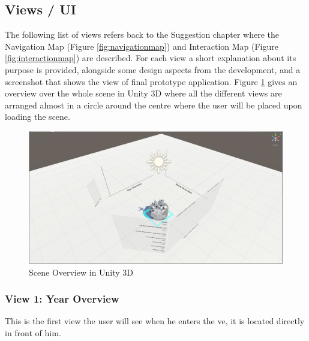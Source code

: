 \subsection{Views / UI}

The following list of views refers back to the Suggestion chapter where the Navigation Map (Figure \ref{fig:navigationmap}) and Interaction Map (Figure \ref{fig:interactionmap}) are described. For each view a short explanation about its purpose is provided, alongside some design aspects from the development, and a screenshot that shows the view of final prototype application. Figure \ref{fig:unityoverview} gives an overview over the whole scene in Unity 3D where all the different views are arranged almost in a circle around the centre where the user will be placed upon loading the scene.

\begin{figure}[h]
	\begin{center}
		\includegraphics[width=12cm]{03_Figures/08_Development/Unity_Overview.png}
		\caption{Scene Overview in Unity 3D}
		\label{fig:unityoverview}
	\end{center}
\end{figure}

\subsubsection{View 1: Year Overview}

This is the first view the user will see when he enters the \gls{ve}, it is located directly in front of him.

